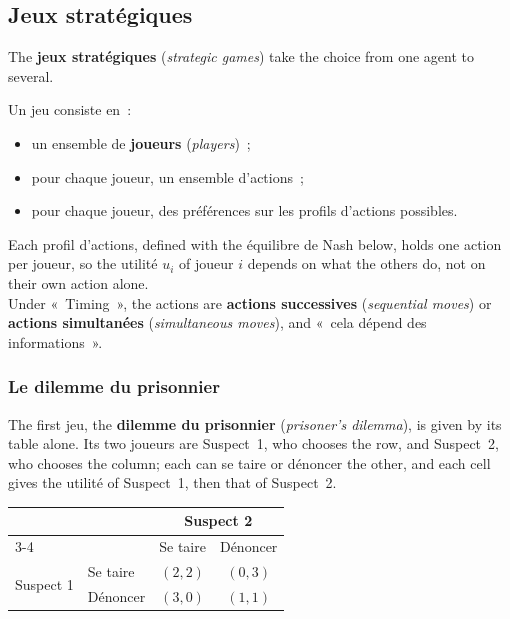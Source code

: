 \subsection{Jeux stratégiques}

The \textbf{jeux stratégiques} (\textit{strategic games}) take the choice from one
agent to several.

\begin{definition}
  Un jeu consiste en~:
  \begin{itemize}
    \item un ensemble de \textbf{joueurs} (\textit{players})~;
    \item pour chaque joueur, un ensemble d'actions~;
    \item pour chaque joueur, des préférences sur les profils d'actions possibles.
  \end{itemize}
\end{definition}

Each profil d'actions, defined with the équilibre de Nash below, holds one action
per joueur, so the utilité $u_i$ of joueur $i$ depends on what the others do, not on
their own action alone.\\

Under «~Timing~», the actions are \textbf{actions successives} (\textit{sequential
moves}) or \textbf{actions simultanées} (\textit{simultaneous moves}), and
«~cela dépend des informations~».

\subsubsection{Le dilemme du prisonnier}

The first jeu, the \textbf{dilemme du prisonnier} (\textit{prisoner's dilemma}),
is given by its table alone. Its two joueurs are Suspect~1, who chooses the row,
and Suspect~2, who chooses the column; each can se taire or dénoncer the other, and
each cell gives the utilité of Suspect~1, then that of Suspect~2.

\begin{center}
  \small
  \begin{tabular}{@{}llcc@{}}
    \toprule
    & & \multicolumn{2}{c}{Suspect 2} \\
    \cmidrule(l){3-4}
    & & Se taire & Dénoncer \\
    \midrule
    \multirow{2}{*}{Suspect 1} & Se taire & $(2, 2)$ & $(0, 3)$ \\
                               & Dénoncer & $(3, 0)$ & $(1, 1)$ \\
    \bottomrule
  \end{tabular}
\end{center}

